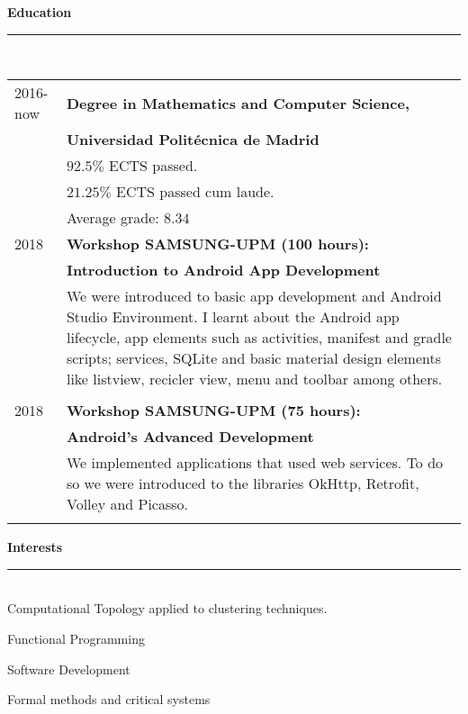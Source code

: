 \documentclass{article}
\begin{document}
\begin{minipage}[c]{0.66\linewidth}
  \textbf{\Large{\color{BlueViolet}Education}}\\[-0.25cm]
  {\color{BlueViolet} \rule{\linewidth}{0.1mm} }\\[-0.25cm]
  \begin{tabular}{l l}
    2016-now& \textbf{Degree in Mathematics and Computer Science,} \\  & \textbf{Universidad Politécnica de Madrid}\\
         & \normalsize \quad $92.5\%$ ECTS passed.\\
            & \normalsize \quad $21.25\%$ ECTS passed cum laude.\\
         & \normalsize \quad Average grade: $8.34$ \\[0.3cm]
    2018 & \textbf{Workshop SAMSUNG-UPM (100 hours):} \\ & \textbf{Introduction to Android App Development} \\
         & \multicolumn{1}{p{10.1cm}}{\normalsize We were introduced to basic app development and Android Studio Environment. I learnt about the Android app lifecycle, app elements such as activities, manifest and gradle scripts; services, SQLite and basic material design elements like listview, recicler view, menu and toolbar among others.} \\ \\[-0.12cm]
    2018 & \textbf{Workshop SAMSUNG-UPM (75 hours):} \\ & \textbf{Android's Advanced Development} \\
         & \multicolumn{1}{p{10.1cm}}{\normalsize We implemented applications that used web services. To do so we were introduced to the libraries OkHttp, Retrofit, Volley and Picasso.} \\ \\[0.3cm]
    
  \end{tabular}
  
  \textbf{\Large{\color{BlueViolet}Interests}}\\[-0.25cm]
  {\color{BlueViolet} \rule{\linewidth}{0.1mm} }\\[-0.25cm]
  Computational Topology applied to clustering techniques.

  Functional Programming

  Software Development

  Formal methods and critical systems
  
\end{minipage}
\end{document}
